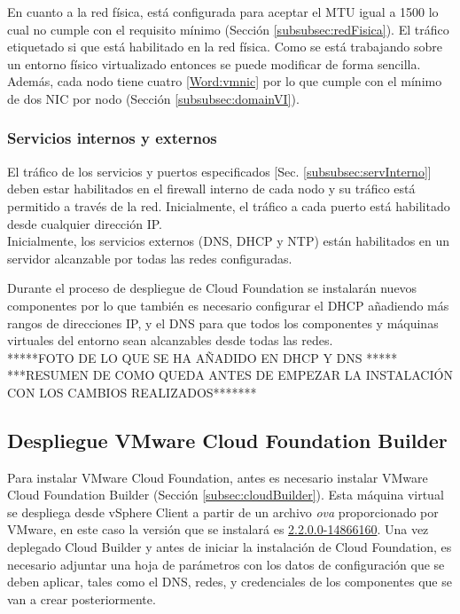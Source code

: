 En cuanto a la red física, está configurada para aceptar el MTU igual a 1500 lo cual no cumple con el requisito mínimo (Sección \ref{subsubsec:redFisica}). El tráfico etiquetado si que está habilitado en la red física. Como se está trabajando sobre un entorno físico virtualizado entonces se puede modificar de forma sencilla. Además, cada nodo tiene cuatro \ref{Word:vmnic} por lo que cumple con el mínimo de dos NIC por nodo (Sección \ref{subsubsec:domainVI}).

\subsubsection{Servicios internos y externos}
El tráfico de los servicios y puertos especificados [Sec. \ref{subsubsec:servInterno}] deben estar habilitados en el firewall interno de cada nodo y su tráfico está permitido a través de la red. Inicialmente, el tráfico a cada puerto está habilitado desde cualquier dirección IP.\\
Inicialmente, los servicios externos (DNS, DHCP y NTP) están habilitados en un servidor alcanzable por todas las redes configuradas.
\iffalse
Como es necesario habilitar una nueva red para el componente vMotion entonces hay que añadir un nuevo adaptador de red en el servidor para que esta red pueda acceder a los servicios y comunicarse con el resto de componentes.\\
\fi
Durante el proceso de despliegue de Cloud Foundation se instalarán nuevos componentes por lo que también es necesario configurar el DHCP añadiendo más rangos de direcciones IP, y el DNS para que todos los componentes y máquinas virtuales del entorno sean alcanzables desde todas las redes.\\
*****FOTO DE LO QUE SE HA AÑADIDO EN DHCP Y DNS *****\\

\iffalse
Los servicios externos (Sección \ref{subsubsec:servExterno}) se deben habilitar en un servidor alcanzable por cada nodo por lo que al añadir nuevas redes al entorno es necesario incluir más adaptadores de red en la máquina virtual con Windows Server para darles acceso al DNS, al DHCP y a NTP.
\fi
***RESUMEN DE COMO QUEDA ANTES DE EMPEZAR LA INSTALACIÓN CON LOS CAMBIOS REALIZADOS*******


\subsection{Despliegue VMware Cloud Foundation Builder}
Para instalar VMware Cloud Foundation, antes es necesario instalar VMware Cloud Foundation Builder (Sección \ref{subsec:cloudBuilder}). Esta máquina virtual se despliega desde vSphere Client a partir de un archivo \textit{ova} proporcionado por VMware, en este caso la versión que se instalará es \underline{2.2.0.0-14866160}.
Una vez deplegado Cloud Builder y antes de iniciar la instalación de Cloud Foundation, es necesario adjuntar una hoja de parámetros con los datos de configuración que se deben aplicar, tales como el DNS, redes, y credenciales de los componentes que se van a crear posteriormente.

